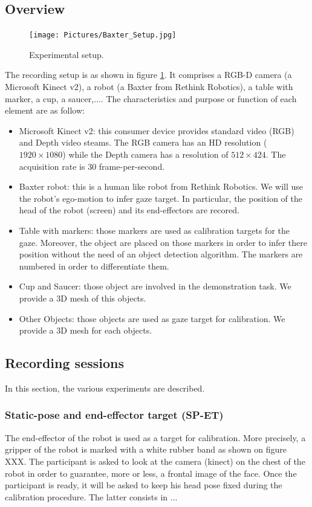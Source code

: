 \documentclass[11pt,a4paper]{article}
\begin{document}
\subsection{Overview}
\label{Overview}
\begin{figure}[!ht]
\begin{center}
\texttt{[image: Pictures/Baxter\_Setup.jpg]}
\end{center}
\caption{Experimental setup. \label{Experimental_Setup}}
\end{figure}
The recording setup is as shown in figure \ref{Experimental_Setup}. It comprises a RGB-D camera (a Microsoft Kinect v2), a robot (a Baxter from Rethink Robotics), a table with marker, a cup, a saucer,.... The characteristics and purpose or function of each element are as follow:
\begin{itemize}
\item Microsoft Kinect v2: this consumer device provides standard video (RGB) and Depth video steams. The RGB camera has an HD resolution ($1920 \times 1080$) while the Depth camera has a resolution of $512 \times 424$. The acquisition rate is 30 frame-per-second.
\item Baxter robot: this is a human like robot from Rethink Robotics. We will use the robot's ego-motion to infer gaze target. In particular, the position of the head of the robot (screen) and its end-effectors are recored.
\item Table with markers: those markers are used as calibration targets for the gaze. Moreover, the object are placed on those markers in order to infer there position without the need of an object detection algorithm. The markers are numbered in order to differentiate them.
\item Cup and Saucer: those object are involved in the demonstration task. We provide a 3D mesh of this objects.
\item Other Objects: those objects are used as gaze target for calibration. We provide a 3D mesh for each objects.
\end{itemize}

\subsection{Recording sessions}
In this section, the various experiments are described.
\subsubsection{Static-pose and end-effector target (SP-ET)}
The end-effector of the robot is used as a target for calibration. More precisely, a gripper of the robot is marked with a white rubber band as shown on figure XXX. The participant is asked to look at the camera (kinect) on the chest of the robot in order to guarantee, more or less, a frontal image of the face. Once the participant is ready, it will be asked to keep his head pose fixed during the calibration procedure. The latter consists in ...
\end{document}
